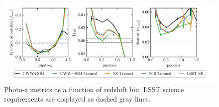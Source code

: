\begin{figure}
    \centering
    \includegraphics{figures/photoz_binned_metrics.pdf}
    \caption{Photo-z metrics as a function of redshift bin. LSST science requirements are displayed as dashed gray lines.}
    \label{fig:photoz_binned}
\end{figure}



